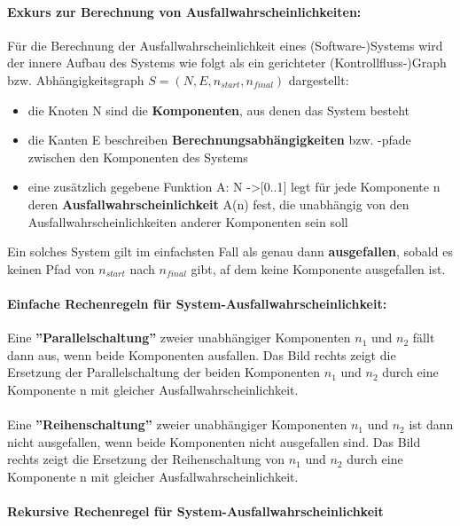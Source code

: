 \paragraph{Exkurs zur Berechnung von Ausfallwahrscheinlichkeiten:}

Für die Berechnung der Ausfallwahrscheinlichkeit eines (Software-)Systems wird der innere Aufbau des Systems wie folgt als ein gerichteter (Kontrollfluss-)Graph bzw. Abhängigkeitsgraph $S=(N,E,n_{start},n_{final})$ dargestellt:
\begin{itemize}
	\item die Knoten N sind die \textbf{Komponenten}, aus denen das System besteht
	\item die Kanten E beschreiben \textbf{Berechnungsabhängigkeiten} bzw. -pfade zwischen den Komponenten des Systems
	\item eine zusätzlich gegebene Funktion A: N ->[0..1] legt für jede Komponente n deren \textbf{Ausfallwahrscheinlichkeit} A(n) fest, die unabhängig von den Ausfallwahrscheinlichkeiten anderer Komponenten sein soll
\end{itemize}
Ein solches System gilt im einfachsten Fall als genau dann \textbf{ausgefallen}, sobald es keinen Pfad von $n_{start}$ nach $n_{final}$ gibt, af dem keine Komponente ausgefallen ist.

\paragraph{Einfache Rechenregeln für System-Ausfallwahrscheinlichkeit:}

Eine \textbf{''Parallelschaltung''} zweier unabhängiger Komponenten $n_{1}$  und $n_{2}$  fällt dann aus, wenn beide Komponenten ausfallen. Das Bild rechts 
zeigt die Ersetzung der Parallelschaltung der beiden Komponenten $n_{1}$  und $n_{2}$  durch eine Komponente n mit gleicher Ausfallwahrscheinlichkeit.
\\
\\
Eine \textbf{''Reihenschaltung''} zweier unabhängiger Komponenten $n_{1}$  und $n_{2}$  ist dann nicht ausgefallen, wenn beide Komponenten nicht ausgefallen sind. Das Bild rechts zeigt die Ersetzung der Reihenschaltung von $n_{1}$  und $n_{2}$  durch eine Komponente n mit gleicher Ausfallwahrscheinlichkeit.

\paragraph{Rekursive Rechenregel für System-Ausfallwahrscheinlichkeit}


